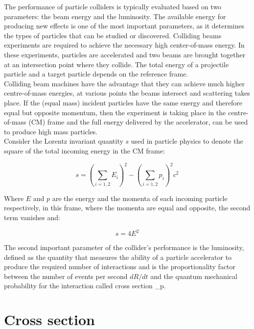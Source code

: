 The performance of particle colliders is typically evaluated based on two parameters: the beam energy and the luminosity. The available energy for producing new effects is one of the most important parameters, as it determines the types of particles that can be studied or discovered. Colliding beams experiments are required to achieve the necessary high center-of-mass energy. In these experiments, particles are accelerated and two beams are brought together at an intersection point where they collide. The total energy of a projectile particle and a target particle depends on the reference frame.\\

Colliding beam machines have the advantage that they can achieve much higher centre-of-mass energies, at various points the beams intersect and scattering takes place. If the (equal mass) incident particles have the same energy and therefore equal but opposite momentum, then the experiment is taking place in the centre-of-mass (CM) frame and the full energy delivered by the accelerator, can be used to produce high mass particles.\\

Consider the Lorentz invariant quantity $s$ used in particle physics to denote the square of the total incoming energy in the CM frame:

\begin{equation}
s = \left ( \sum_{i = 1,2}^{}E_{i} \right )^{2}-\left ( \sum_{i = 1,2}^{}p_{i} \right )^{2}c^{2}
\end{equation}

Where $E$ and \textbf{$p$}  are the energy and the momenta of each incoming particle respectively, in this  frame, where the momenta are equal and opposite, the second term vanishes and: 

\begin{equation}
s = 4E^2 
\end{equation}

The second important parameter of the collider's performance is the luminosity, defined as the  quantity that measures the ability of a particle accelerator to produce the required number of interactions and is the proportionality factor  between the number of events per second $dR/dt$ and the quantum mechanical probability for the interaction called cross section \sigma_{p}.

\section{Cross section}

